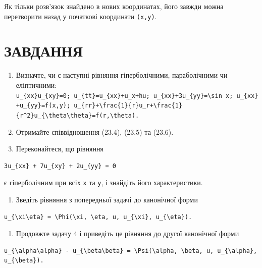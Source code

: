 \documentclass[
  ukrainian,
]{article}
\providecommand{\tightlist}{%
  \setlength{\itemsep}{0pt}\setlength{\parskip}{0pt}}
\begin{document}
Як тільки розв'язок знайдено в нових координатах, його завжди можна
перетворити назад у початкові координати \texttt{(x,y)}.

\section{ЗАВДАННЯ}\label{ux437ux430ux432ux434ux430ux43dux43dux44f-6}

\begin{enumerate}
\def\labelenumi{\arabic{enumi}.}
\item
  Визначте, чи є наступні рівняння гіперболічними, параболічними чи
  еліптичними:
  \texttt{\textquotesingle{}u\_\{xx\}u\_\{xy\}=0\textquotesingle{};\ \textquotesingle{}u\_\{tt\}=u\_\{xx\}+u\_x+hu\textquotesingle{};\ \textquotesingle{}u\_\{xx\}+3u\_\{yy\}=\textbackslash{}sin\ x\textquotesingle{};\ \textquotesingle{}u\_\{xx\}+u\_\{yy\}=f(x,y)\textquotesingle{};\ \textquotesingle{}u\_\{rr\}+\textbackslash{}frac\{1\}\{r\}u\_r+\textbackslash{}frac\{1\}\{r\^{}2\}u\_\{\textbackslash{}theta\textbackslash{}theta\}=f(r,\textbackslash{}theta)\textquotesingle{}.}
\item
  Отримайте співвідношення (23.4), (23.5) та (23.6).
\item
  Переконайтеся, що рівняння
\end{enumerate}

\begin{verbatim}
3u_{xx} + 7u_{xy} + 2u_{yy} = 0
\end{verbatim}

є гіперболічним при всіх \texttt{x} та \texttt{y}, і знайдіть його
характеристики.

\begin{enumerate}
\def\labelenumi{\arabic{enumi}.}
\setcounter{enumi}{3}
\tightlist
\item
  Зведіть рівняння з попередньої задачі до канонічної форми
\end{enumerate}

\begin{verbatim}
u_{\xi\eta} = \Phi(\xi, \eta, u, u_{\xi}, u_{\eta}).
\end{verbatim}

\begin{enumerate}
\def\labelenumi{\arabic{enumi}.}
\setcounter{enumi}{4}
\tightlist
\item
  Продовжте задачу 4 і приведіть це рівняння до другої канонічної форми
\end{enumerate}

\begin{verbatim}
u_{\alpha\alpha} - u_{\beta\beta} = \Psi(\alpha, \beta, u, u_{\alpha}, u_{\beta}).
\end{verbatim}
\end{document}
